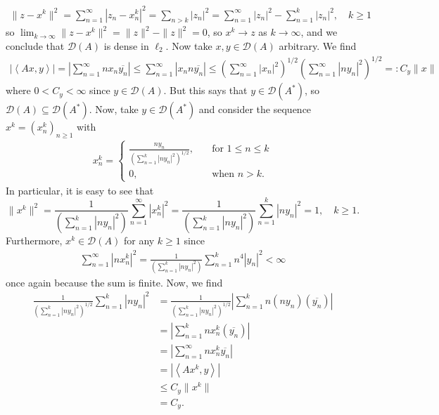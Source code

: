 \documentclass[10pt]{article}
\newcommand{\1}[1]{\mathbbm{1}_{#1}} \newcommand{\mc}[1]{\mathcal{#1}}
\newcommand{\ip}[2]{\left\langle#1,#2\right\rangle }
\begin{document}
    \begin{align*}
        \|z-x^k\|^2=\sum_{n=1}^\infty|z_n-x^k_n|^2=\sum_{n>k}|z_n|^2=\sum_{n=1}^\infty|z_n|^2-\sum_{n=1}^k|z_n|^2,\quad k\geq 1
    \end{align*}
    so $\lim_{k\rightarrow\infty}\|z-x^k\|^2=\|z\|^2-\|z\|^2=0$, so $x^k\rightarrow z$ as $k\rightarrow\infty$, and we conclude that $\mc{D}(A)$ is dense in $\ell_2$.
    Now take $x,y\in\mc{D}(A)$ arbitrary. We find
    \begin{align*}
        |\ip{Ax}{y}|=\left|\sum_{n=1}^\infty nx_n\overline{y_n}\right|\leq\sum_{n=1}^\infty |x_n n\overline{y_n}|\leq\left(\sum_{n=1}^\infty|x_n|^2\right)^{1/2}\left(\sum_{n=1}^\infty|ny_n|^2\right)^{1/2}=:C_y\|x\|
    \end{align*}
    where $0<C_y<\infty$ since $y\in\mc{D}(A)$. But this says that $y\in\mc{D}(A^\ast)$, so $\mc{D}(A)\subseteq\mc{D}(A^\ast)$. Now, take $y\in\mc{D}(A^\ast)$ and consider the sequence $x^k=(x^k_n)_{n\geq 1}$ with
    \begin{align*}
        x^k_n=\begin{cases}
            \frac{ny_n}{\left(\sum_{n=1}^k|ny_n|^2\right)^{1/2}},\quad&\text{for $1\leq n\leq k$}\\
            0,\quad&\text{when $n>k$.}
        \end{cases}
    \end{align*}
    In particular, it is easy to see that
    \[\|x^k\|^2=\frac{1}{\left(\sum_{n=1}^k|ny_n|^2\right)}\sum_{n=1}^\infty |x^k_n|^2=\frac{1}{\left(\sum_{n=1}^k|ny_n|^2\right)}\sum_{n=1}^k |ny_n|^2=1,\quad k\geq 1.\]
    Furthermore, $x^k\in\mc{D}(A)$ for any $k\geq 1$ since 
    \begin{align*}
        \sum_{n=1}^\infty |nx^k_n|^2=\frac{1}{\left(\sum_{n=1}^k|ny_n|^2\right)}\sum_{n=1}^kn^4|y_n|^2<\infty
    \end{align*}
    once again because the sum is finite. Now, we find
    \begin{align*}
        \frac{1}{\left(\sum_{n=1}^k|ny_n|^2\right)^{1/2}}\sum_{n=1}^k|ny_n|^2&=\frac{1}{\left(\sum_{n=1}^k|ny_n|^2\right)^{1/2}}\left|\sum_{n=1}^kn(ny_n)(\overline{y_n})\right|\\
        &=\left|\sum_{n=1}^knx^k_n(\overline{y_n})\right|\tag{5}\\
        &=\left|\sum_{n=1}^\infty nx^k_n\overline{y_n}\right|\tag{6}\\
        &=\left|\ip{Ax^k}{y}\right|\\
        &\leq C_y\|x^k\|\tag{7}\\
        &=C_y.\tag{8}
    \end{align*}
\end{document}
